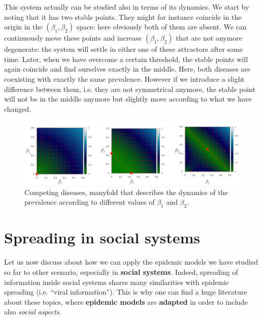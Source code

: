 \documentclass[../main/main.tex]{subfiles}
\begin{document}
This system actually can be studied also in terms of its dynamics. We start by noting that it has two stable points. They might for instance coincide in the origin in the $(\beta_1, \beta_2)$ space: here obviously both of them are absent. We can continuously move these points and increase $(\beta_1, \beta_2)$ that are not anymore degenerate: the system will settle in either one of these attractors after some time. Later, when we have overcome a certain threshold, the stable points will again coincide and find ourselves exactly in the middle. Here, both diseases are coexisting with exactly the same prevalence. However if we introduce a slight difference between them, i.e. they are not symmetrical anymore, the stable point will not be in the middle anymore but slightly move according to what we have changed.

\begin{figure}[h!]
\centering
\includegraphics[width=1.0\textwidth]{../lessons/image/11/image010.png}
\caption{\label{fig:11_010} Competing diseases, manyfold that describes the dynamics of the prevalence according to different values of $\beta_1$ and $\beta_2$. }
\end{figure}

\chapter{Spreading in social systems}

Let us now discuss about how we can apply the epidemic models we have studied so far to other scenario, especially in \textbf{social systems}. Indeed, spreading of information inside social systems shares many similarities with epidemic spreading (i.e. “viral information”). This is why one can find a huge literature about these topics, where \textbf{epidemic models} are \textbf{adapted} in order to include also \textit{social aspects}.
\end{document}
